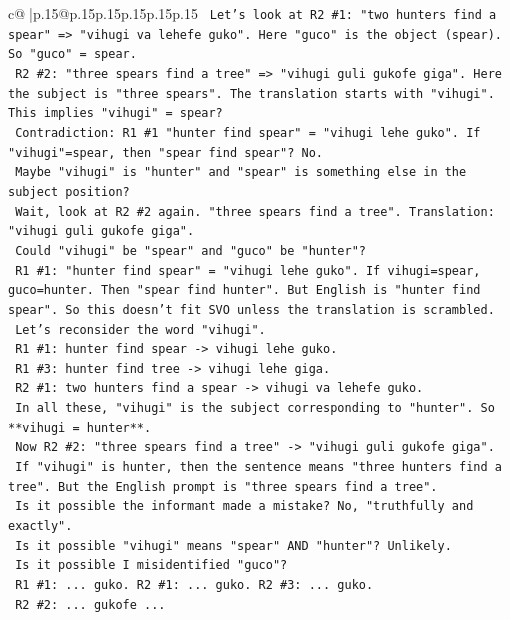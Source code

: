 \documentclass{article}
\begin{document}
{\begin{supertabular}{c@{$\;$}|p{.15\linewidth}@{}p{.15\linewidth}p{.15\linewidth}p{.15\linewidth}p{.15\linewidth}p{.15\linewidth}}
{{{\texttt{   Let's look at R2 \#1: "two hunters find a spear" => "vihugi va lehefe guko". Here "guco" is the object (spear). So "guco" = spear.} \\
\texttt{   R2 \#2: "three spears find a tree" => "vihugi guli gukofe giga". Here the subject is "three spears". The translation starts with "vihugi". This implies "vihugi" = spear?} \\
\texttt{   Contradiction: R1 \#1 "hunter find spear" = "vihugi lehe guko". If "vihugi"=spear, then "spear find spear"? No.} \\
\texttt{   Maybe "vihugi" is "hunter" and "spear" is something else in the subject position?} \\
\texttt{   Wait, look at R2 \#2 again. "three spears find a tree". Translation: "vihugi guli gukofe giga".} \\
\texttt{   Could "vihugi" be "spear" and "guco" be "hunter"?} \\
\texttt{   R1 \#1: "hunter find spear" = "vihugi lehe guko". If vihugi=spear, guco=hunter. Then "spear find hunter". But English is "hunter find spear". So this doesn't fit SVO unless the translation is scrambled.} \\
\texttt{   Let's reconsider the word "vihugi".} \\
\texttt{   R1 \#1: hunter find spear {-}> vihugi lehe guko.} \\
\texttt{   R1 \#3: hunter find tree {-}> vihugi lehe giga.} \\
\texttt{   R2 \#1: two hunters find a spear {-}> vihugi va lehefe guko.} \\
\texttt{   In all these, "vihugi" is the subject corresponding to "hunter". So **vihugi = hunter**.} \\
\texttt{   Now R2 \#2: "three spears find a tree" {-}> "vihugi guli gukofe giga".} \\
\texttt{   If "vihugi" is hunter, then the sentence means "three hunters find a tree". But the English prompt is "three spears find a tree".} \\
\texttt{   Is it possible the informant made a mistake? No, "truthfully and exactly".} \\
\texttt{   Is it possible "vihugi" means "spear" AND "hunter"? Unlikely.} \\
\texttt{   Is it possible I misidentified "guco"?} \\
\texttt{   R1 \#1: ... guko. R2 \#1: ... guko. R2 \#3: ... guko.} \\
\texttt{   R2 \#2: ... gukofe ...} \\
}}}
\end{supertabular}}
\end{document}

